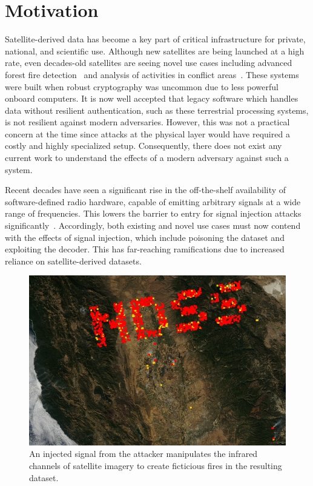 \section{Motivation}

Satellite-derived data has become a key part of critical infrastructure for private, national, and scientific use.
Although new satellites are being launched at a high rate, even decades-old satellites are seeing novel use cases including advanced forest fire detection~\cite{nasaFirms} and analysis of activities in conflict areas~\cite{separatistLuminosity}. %
These systems were built when robust cryptography was uncommon due to less powerful onboard computers.
It is now well accepted that legacy software which handles data without resilient authentication, such as these terrestrial processing systems, is not resilient against modern adversaries.
However, this was not a practical concern at the time since attacks at the physical layer would have required a costly and highly specialized setup.
Consequently, there does not exist any current work to understand the effects of a modern adversary against such a system.

Recent decades have seen a significant rise in the off-the-shelf availability of software-defined radio hardware, capable of emitting arbitrary signals at a wide range of frequencies.
This lowers the barrier to entry for signal injection attacks significantly~\cite{manulis2021cyber}. %
Accordingly, both existing and novel use cases must now contend with the effects of signal injection, which include poisoning the dataset and exploiting the decoder.
This has far-reaching ramifications due to increased reliance on satellite-derived datasets.

\begin{figure}
    \includegraphics[width=\columnwidth]{diagrams/injection/pixels_800_140.jpg}
    \caption{An injected signal from the attacker manipulates the infrared channels of satellite imagery to create ficticious fires in the resulting dataset.}
    \label{fig:location-injection}
\end{figure}

